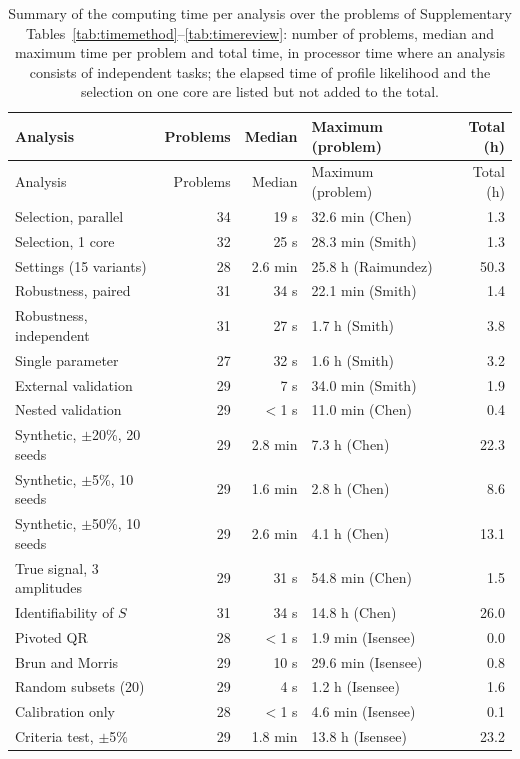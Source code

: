 \begin{longtable}{@{}lrrlr@{}}
\caption{Summary of the computing time per analysis over the problems of Supplementary Tables~\ref{tab:timemethod}--\ref{tab:timereview}: number of problems, median and maximum time per problem and total time, in processor time where an analysis consists of independent tasks; the elapsed time of profile likelihood and the selection on one core are listed but not added to the total.}\label{tab:timesummary}\\
\toprule
Analysis & Problems & Median & Maximum (problem) & Total (h) \\
\midrule
\endfirsthead
\toprule
Analysis & Problems & Median & Maximum (problem) & Total (h) \\
\midrule
\endhead
Selection, parallel & 34 & 19 s & 32.6 min (Chen) & 1.3 \\
Selection, 1 core & 32 & 25 s & 28.3 min (Smith) & 1.3 \\
Settings (15 variants) & 28 & 2.6 min & 25.8 h (Raimundez) & 50.3 \\
Robustness, paired & 31 & 34 s & 22.1 min (Smith) & 1.4 \\
Robustness, independent & 31 & 27 s & 1.7 h (Smith) & 3.8 \\
Single parameter & 27 & 32 s & 1.6 h (Smith) & 3.2 \\
External validation & 29 & 7 s & 34.0 min (Smith) & 1.9 \\
Nested validation & 29 & $<$1 s & 11.0 min (Chen) & 0.4 \\
Synthetic, $\pm$20\%, 20 seeds & 29 & 2.8 min & 7.3 h (Chen) & 22.3 \\
Synthetic, $\pm$5\%, 10 seeds & 29 & 1.6 min & 2.8 h (Chen) & 8.6 \\
Synthetic, $\pm$50\%, 10 seeds & 29 & 2.6 min & 4.1 h (Chen) & 13.1 \\
True signal, 3 amplitudes & 29 & 31 s & 54.8 min (Chen) & 1.5 \\
Identifiability of $S$ & 31 & 34 s & 14.8 h (Chen) & 26.0 \\
Pivoted QR & 28 & $<$1 s & 1.9 min (Isensee) & 0.0 \\
Brun and Morris & 29 & 10 s & 29.6 min (Isensee) & 0.8 \\
Random subsets (20) & 29 & 4 s & 1.2 h (Isensee) & 1.6 \\
Calibration only & 28 & $<$1 s & 4.6 min (Isensee) & 0.1 \\
Criteria test, $\pm$5\% & 29 & 1.8 min & 13.8 h (Isensee) & 23.2 \\

\end{longtable}
